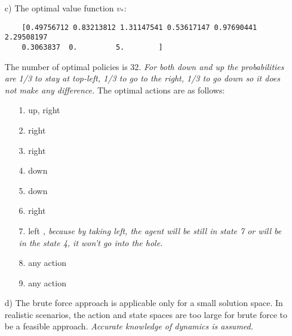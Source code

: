 \documentclass{article}
\begin{document}
\begin{enumerate}
\begin{verbatim}
	Value function for policy_right (always going right):
	[0.41401777 0.77456266 1.31147541 0.36398621 0.8185719  2.29508197
	0.13235862 0.         5.        ]
	\end{verbatim}
	This is entirely expected since going left from every state takes the agent away from the terminal state (goal) and the agent has a lower probability of reaching the goal, which leads to a low cumulative reward. However going right from every state takes the agent closer to the goal and the agent has a higher probability of landing in the goal.
	\item[c)] The optimal value function $v_*$:
	\begin{verbatim}
	[0.49756712 0.83213812 1.31147541 0.53617147 0.97690441 2.29508197
	0.3063837  0.         5.        ]
	\end{verbatim}
	The number of optimal policies is 32.
	\textit{For both down and up the probabilities are 1/3 to stay at top-left, 1/3 to go to the right, 1/3 to go down so it does not make any difference.}
	The optimal actions are as follows:
	\begin{enumerate}
		\item[1.] up, right
		\item[2.] right
		\item[3.] right
		\item[4.] down
		\item[5.] down
		\item[6.] right
		\item[7.] left \textit{, because by taking left, the agent will be still in state 7 or will be in the state 4, it won't go into the hole.}
		\item[8.] any action
		\item[9.] any action
	\end{enumerate}
	\item[d)] The brute force approach is applicable only for a small solution space. In realistic scenarios, the action and state spaces are too large for brute force to be a feasible approach.\linebreak
	\textit{Accurate knowledge of dynamics is assumed.}
\end{enumerate}
\end{document}
